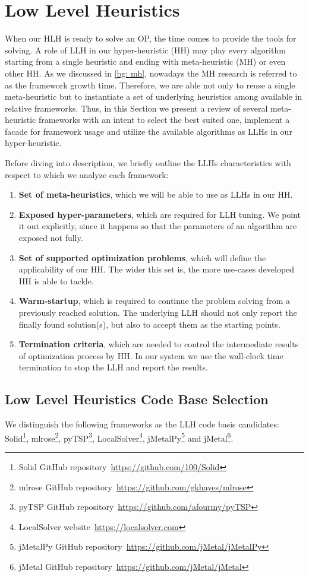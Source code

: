 \section{Low Level Heuristics}\label{impl: LLH}
When our HLH is ready to solve an OP, the time comes to provide the tools for solving. A role of LLH in our hyper-heuristic (HH) may play every algorithm starting from a single heuristic and ending with meta-heuristic (MH) or even other HH. As we discussed in \cref{bg: mh}, nowadays the MH research is referred to as the framework growth time. Therefore, we are able not only to reuse a single meta-heuristic but to instantiate a set of underlying heuristics among available in relative frameworks. Thus, in this Section we present a review of several meta-heuristic frameworks with an intent to select the best suited one, implement a facade for framework usage and utilize the available algorithms as LLHs in our hyper-heuristic.

Before diving into description, we briefly outline the LLHs characteristics with respect to which we analyze each framework:
\begin{enumerate}
	\item \textbf{Set of meta-heuristics}, which we will be able to use as LLHs in our HH.
	
	\item \textbf{Exposed hyper-parameters}, which are required for LLH tuning. We point it out explicitly, since it happens so that the parameters of an algorithm are exposed not fully.
	
	\item \textbf{Set of supported optimization problems}, which will define the applicability of our HH. The wider this set is, the more use-cases developed HH is able to tackle.
	
	\item \textbf{Warm-startup}, which is required to continue the problem solving from a previously reached solution. The underlying LLH should not only report the finally found solution(s), but also to accept them as the starting points.
	
	\item \textbf{Termination criteria}, which are needed to control the intermediate results of optimization process by HH. In our system we use the wall-clock time termination to stop the LLH and report the results.
\end{enumerate}


\subsection{Low Level Heuristics Code Base Selection}\label{implementation:llh code basis selection}
We distinguish the following frameworks as the LLH code basis candidates: Solid\footnote{Solid GitHub repository~\url{https://github.com/100/Solid}}, mlrose\footnote{mlrose GitHub repository~\url{https://github.com/gkhayes/mlrose}}, pyTSP\footnote{pyTSP GitHub repository~\url{https://github.com/afourmy/pyTSP}}, LocalSolver\footnote{LocalSolver website~\url{https://localsolver.com}}, jMetalPy\footnote{jMetalPy GitHub repository~\url{https://github.com/jMetal/jMetalPy}} and jMetal\footnote{jMetal GitHub repository~\url{https://github.com/jMetal/jMetal}}.


